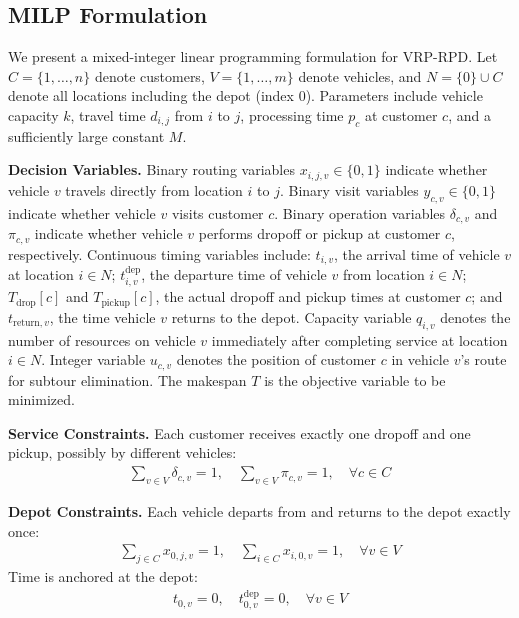 \documentclass[sigconf]{acmart}
\begin{document}
\subsection{MILP Formulation}

We present a mixed-integer linear programming formulation for VRP-RPD. Let
$C=\{1,\ldots,n\}$ denote customers, $V=\{1,\ldots,m\}$ denote vehicles, and
$N=\{0\}\cup C$ denote all locations including the depot (index $0$).
Parameters include vehicle capacity $k$, travel time $d_{i,j}$ from $i$ to $j$,
processing time $p_c$ at customer $c$, and a sufficiently large constant $M$.

\textbf{Decision Variables.}
Binary routing variables $x_{i,j,v}\in\{0,1\}$ indicate whether vehicle $v$
travels directly from location $i$ to $j$.
Binary visit variables $y_{c,v}\in\{0,1\}$ indicate whether vehicle $v$ visits
customer $c$.
Binary operation variables $\delta_{c,v}$ and $\pi_{c,v}$ indicate whether
vehicle $v$ performs dropoff or pickup at customer $c$, respectively.
Continuous timing variables include: $t_{i,v}$, the arrival time of vehicle $v$
at location $i\in N$; $t^{\text{dep}}_{i,v}$, the departure time of vehicle $v$
from location $i\in N$; $T_{\text{drop}}[c]$ and $T_{\text{pickup}}[c]$, the
actual dropoff and pickup times at customer $c$; and $t_{\text{return},v}$, the
time vehicle $v$ returns to the depot.
Capacity variable $q_{i,v}$ denotes the number of resources on vehicle $v$
immediately after completing service at location $i\in N$.
Integer variable $u_{c,v}$ denotes the position of customer $c$ in vehicle $v$'s
route for subtour elimination.
The makespan $T$ is the objective variable to be minimized.

\textbf{Service Constraints.}
Each customer receives exactly one dropoff and one pickup, possibly by different
vehicles:
\begin{align}
\sum_{v\in V}\delta_{c,v}=1,\quad \sum_{v\in V}\pi_{c,v}=1,\quad \forall c\in C
\end{align}

\textbf{Depot Constraints.}
Each vehicle departs from and returns to the depot exactly once:
\begin{align}
\sum_{j\in C} x_{0,j,v} = 1,\quad \sum_{i\in C} x_{i,0,v} = 1,\quad \forall v\in V
\end{align}
Time is anchored at the depot:
\begin{align}
t_{0,v}=0,\quad t^{\text{dep}}_{0,v}=0,\quad \forall v\in V
\end{align}
\end{document}
